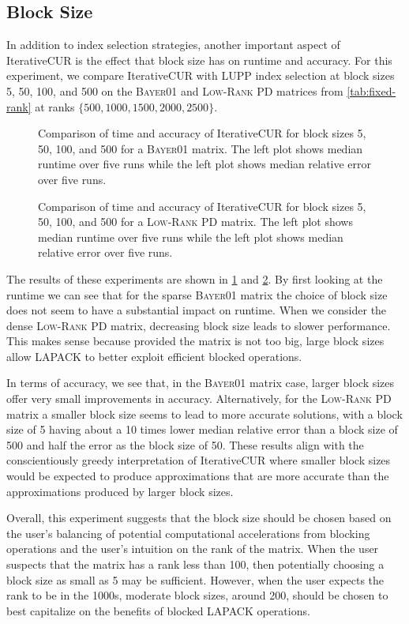 \subsection{Block Size}
In addition to index selection strategies, another important aspect of IterativeCUR is the effect that block size has on runtime and accuracy. For this experiment, we compare IterativeCUR with LUPP index selection at block sizes 5, 50, 100, and 500 on the \textsc{Bayer01} and \textsc{Low-Rank PD} matrices from \cref{tab:fixed-rank} at ranks $\{500,1000,1500,2000,2500\}$.


\begin{figure}[h]
    \centering
    
    \caption{Comparison of time and accuracy of IterativeCUR for block sizes 5, 50, 100, and 500 for a \textsc{Bayer01} matrix. The left plot shows median runtime over five runs while the left plot shows median relative error over five runs.}
    \label{fig:bayer01_bs}
\end{figure}
\begin{figure}[h]
    \centering
    
    \caption{Comparison of time and accuracy of IterativeCUR for block sizes 5, 50, 100, and 500 for a \textsc{Low-Rank PD} matrix. The left plot shows median runtime over five runs while the left plot shows median relative error over five runs.}
    \label{fig:low_rank_pd_bs}
\end{figure}

The results of these experiments are shown in \cref{fig:bayer01_bs} and \cref{fig:low_rank_pd_bs}. By first looking at the runtime we can see that for the sparse \textsc{Bayer01} matrix the choice of block size does not seem to have a substantial impact on runtime. When we consider the dense \textsc{Low-Rank PD} matrix, decreasing block size leads to slower performance. This makes sense because provided the matrix is not too big, large block sizes allow LAPACK to better exploit efficient blocked operations. 

In terms of accuracy, we see that, in the \textsc{Bayer01} matrix case, larger block sizes offer very small improvements in accuracy. Alternatively, for the \textsc{Low-Rank PD} matrix a smaller block size seems to lead to more accurate solutions, with a block size of 5 having about a 10 times lower median relative error than a block size of 500 and half the error as the block size of 50. These results align with the conscientiously greedy interpretation of IterativeCUR where smaller block sizes would be expected to produce approximations that are more accurate than the approximations produced by larger block sizes. 

Overall, this experiment suggests that the block size should be chosen based on the user's balancing of potential computational accelerations from blocking operations and the user's intuition on the rank of the matrix. When the user suspects that the matrix has a rank less than 100, then potentially choosing a block size as small as 5 may be sufficient. However, when the user expects the rank to be in the 1000s, moderate block sizes, around 200, should be chosen to best capitalize on the benefits of blocked LAPACK operations. 

